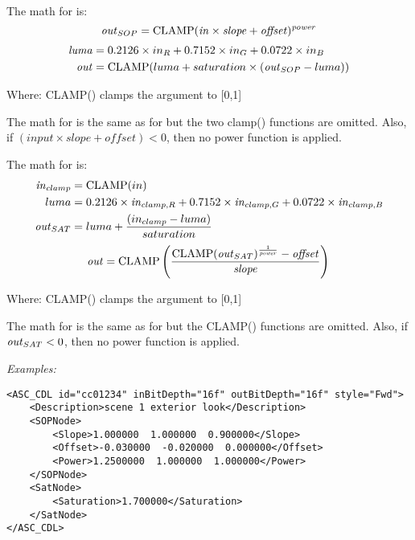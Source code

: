 The math for  is:
\begin{equation} \label{eq:cdl-fwd}
    \text{\emph{out}}_{SOP} = \mathrm{CLAMP}(\text{\emph{in}} \times \text{\emph{slope}} + \text{\emph{offset}})^{\text{\emph{power}}} \\
\end{equation}
\begin{equation}
    \begin{aligned}
        \text{\emph{luma}} &= 0.2126 \times in_R + 0.7152 \times in_G + 0.0722 \times in_B \\
        \text{\emph{out}} &= \mathrm{CLAMP}(luma + saturation \times (\text{\emph{out}}_{SOP} - luma))
    \end{aligned}
\end{equation}

\tabto{0.5in}Where:
\tabto{0.75in} CLAMP() clamps the argument to [0,1]

The math for  is the same as for  but the two clamp() functions are omitted. Also, if $(input \times slope + offset) < 0$, then no power function is applied.

The math for  is:
\begin{equation}
    \begin{aligned}
        \text{\emph{in}}_{clamp} &= \mathrm{CLAMP}(in) \\
        luma &= 0.2126 \times \text{\emph{in}}_{clamp,R} + 0.7152 \times \text{\emph{in}}_{clamp,G} + 0.0722 \times \text{\emph{in}}_{clamp,B} \\
        \text{\emph{out}}_{SAT} &= luma + \frac{(in_{clamp} - luma)}{saturation}
    \end{aligned}
\end{equation}
\begin{equation}  \label{eq:cdl-rev}
    \text{\emph{out}} = \mathrm{CLAMP}\left(\frac{\mathrm{CLAMP}(\text{\emph{out}}_{SAT})^{\frac{1}{\text{\emph{power}}}} - \text{\emph{offset}}}{\text{\emph{slope}}}\right) \\
\end{equation}

\tabto{0.5in}Where:
\tabto{0.75in} CLAMP() clamps the argument to [0,1]

The math for  is the same as for  but the CLAMP() functions are omitted. Also, if $\text{\emph{out}}_{SAT} < 0$, then no power function is applied.

\emph{Examples:}
\begin{lstlisting}[caption=Example of an \xml{ASC\_CDL} node,label=ex:asccdl]
<ASC_CDL id="cc01234" inBitDepth="16f" outBitDepth="16f" style="Fwd">
    <Description>scene 1 exterior look</Description>
    <SOPNode>
        <Slope>1.000000  1.000000  0.900000</Slope>
        <Offset>-0.030000  -0.020000  0.000000</Offset>
        <Power>1.2500000  1.000000  1.000000</Power>
    </SOPNode>
    <SatNode>
        <Saturation>1.700000</Saturation>
    </SatNode>
</ASC_CDL>
\end{lstlisting}
